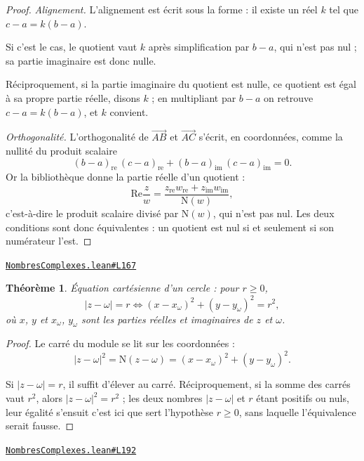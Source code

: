 \documentclass[11pt,a4paper]{article}
\theoremstyle{definition}
\theoremstyle{plain}
\newtheorem{theoreme}{Théorème}
\newcommand{\source}[2]{\par\smallskip\noindent\hfill{\footnotesize\href{#1}{\texttt{#2}}}\par\smallskip}
\begin{document}
\begin{proof}
\emph{Alignement.} L'alignement est écrit sous la forme : il existe un réel $k$ tel que
$c - a = k(b - a)$.

Si c'est le cas, le quotient vaut $k$ après simplification par $b - a$, qui n'est pas nul ;
sa partie imaginaire est donc nulle.

Réciproquement, si la partie imaginaire du quotient est nulle, ce quotient est égal à sa
propre partie réelle, disons $k$ ; en multipliant par $b - a$ on retrouve $c - a = k(b-a)$,
et $k$ convient.

\smallskip\noindent
\emph{Orthogonalité.} L'orthogonalité de $\overrightarrow{AB}$ et $\overrightarrow{AC}$
s'écrit, en coordonnées, comme la nullité du produit scalaire
\[ (b-a)_{\mathrm{re}}\,(c-a)_{\mathrm{re}} + (b-a)_{\mathrm{im}}\,(c-a)_{\mathrm{im}} = 0 . \]
Or la bibliothèque donne la partie réelle d'un quotient :
\[ \mathrm{Re}\frac{z}{w}
   = \frac{z_{\mathrm{re}} w_{\mathrm{re}} + z_{\mathrm{im}} w_{\mathrm{im}}}{\mathrm{N}(w)} , \]
c'est-à-dire le produit scalaire divisé par $\mathrm{N}(w)$, qui n'est pas nul. Les deux
conditions sont donc équivalentes : un quotient est nul si et seulement si son numérateur
l'est.
\end{proof}
\source{https://github.com/Commutator-IO/learn-lean/blob/main/cours/02-lycee/07-nombres-complexes/NombresComplexes.lean\#L167}{NombresComplexes.lean\#L167}

\begin{theoreme}
Équation cartésienne d'un cercle : pour $r \ge 0$,
\[ |z - \omega| = r \iff (x - x_\omega)^{2} + (y - y_\omega)^{2} = r^{2} , \]
où $x$, $y$ et $x_\omega$, $y_\omega$ sont les parties réelles et imaginaires de $z$ et
$\omega$.
\end{theoreme}

\begin{proof}
Le carré du module se lit sur les coordonnées :
\[ |z - \omega|^{2} = \mathrm{N}(z - \omega)
   = (x - x_\omega)^{2} + (y - y_\omega)^{2} . \]

Si $|z - \omega| = r$, il suffit d'élever au carré. Réciproquement, si la somme des carrés
vaut $r^{2}$, alors $|z-\omega|^{2} = r^{2}$ ; les deux nombres $|z - \omega|$ et $r$ étant
positifs ou nuls, leur égalité s'ensuit \textemdash{} c'est ici que sert l'hypothèse
$r \ge 0$, sans laquelle l'équivalence serait fausse.
\end{proof}
\source{https://github.com/Commutator-IO/learn-lean/blob/main/cours/02-lycee/07-nombres-complexes/NombresComplexes.lean\#L192}{NombresComplexes.lean\#L192}
\end{document}
